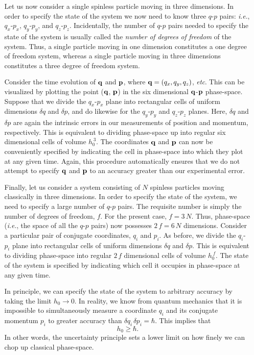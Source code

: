 Let us now consider a single spinless particle moving in three dimensions. In order
to specify the state of the system we now need to know three $q$-$p$ pairs:
{\em i.e.}, $q_x$-$p_x$, $q_y$-$p_y$, and $q_z$-$p_z$. Incidentally,
the number of $q$-$p$ pairs needed to specify the state of the
system is usually called the {\em number of degrees of freedom}\/ of the
system. Thus, a single particle moving in one dimension constitutes a one
degree of freedom system, whereas a single particle moving
in three dimensions constitutes  a three degree of freedom system. 

Consider the time evolution of ${\bf q}$ and ${\bf p}$, where
${\bf q}=(q_x,q_y,q_z)$, {\em etc}.
 This can be visualized by plotting
the point (${\bf q}$, ${\bf p}$)  in the six dimensional 
${\bf q}$-${\bf p}$ phase-space.
Suppose that we divide the $q_x$-$p_x$ plane
into rectangular cells  of uniform dimensions
$\delta q$ and $\delta p$, and do likewise for the $q_y$-$p_y$ and
$q_z$-$p_z$ planes. Here, $\delta q$ and $\delta p$ are again the intrinsic
errors in our measurements of position and momentum, respectively.
This is equivalent to dividing phase-space up into
regular six dimensional cells of volume $h_0^{~3}$.  
The  coordinates ${\bf q}$ and ${\bf p}$ can now be
conveniently  specified   by indicating
 the cell in phase-space into which they plot  at any given time. 
Again, this procedure automatically ensures that we do not attempt to specify
${\bf q}$ and ${\bf p}$  to an accuracy greater than our experimental error.

Finally, let us consider a system consisting of $N$ spinless particles moving
classically in three dimensions. 
 In order to specify
the state of the system, we need to specify a large number of $q$-$p$ pairs. 
The requisite
number is simply the number of degrees of freedom, $f$.
For
the present case,
$f=3\,N$. Thus, phase-space ({\em i.e.}, the space of all the $q$-$p$ pairs)
now possesses $2\,f=6\,N$ dimensions.
Consider a particular pair of conjugate coordinates, $q_i$ and
$p_i$. 
As before, we divide the $q_i$-$p_i$ 
plane into rectangular cells  of uniform dimensions
$\delta q$ and $\delta p$. 
This is equivalent to dividing phase-space into regular $2\,f$ dimensional cells of volume $h_0^{~f}$. The state of the
system is specified by indicating which cell it occupies in phase-space
at any given time.

In principle, we can  specify the state of the system to arbitrary
accuracy by taking the limit $h_0\rightarrow 0$. In reality, we know from
quantum mechanics that it is impossible to simultaneously
measure a coordinate $q_i$ and
its conjugate momentum $p_i$ to greater accuracy than 
$\delta q_i\, \delta p_i=\hbar$.
This implies that 
\begin{equation}
h_0\geq \hbar.
\end{equation} 
In other words, the uncertainty principle sets a lower limit on how finely 
we can chop up
classical phase-space.

